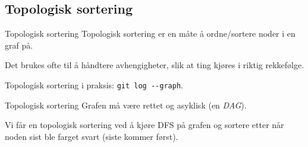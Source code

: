 \documentclass[14pt]{beamer}
\begin{document}
\subsection{Topologisk sortering}
\begin{frame}[fragile]{Topologisk sortering}
    Topologisk sortering er en måte å ordne/sortere noder i en graf på.

    \pause

    Det brukes ofte til å håndtere avhengigheter, slik at ting kjøres i riktig rekkefølge.

    \pause

    Topologisk sortering i praksis: \verb|git log --graph|.
\end{frame}
\begin{frame}{Topologisk sortering}
    Grafen må være rettet og asyklisk (en \textit{DAG}).

    \pause

    Vi får en topologisk sortering ved å kjøre DFS på grafen og sortere etter når noden sist ble farget svart (siste kommer først).
\end{frame}
\end{document}
